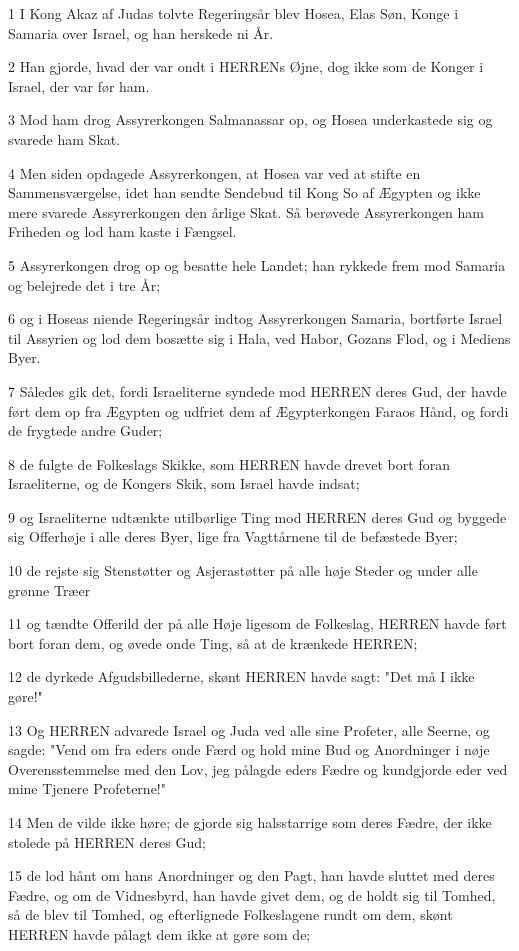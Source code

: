 \par 1 I Kong Akaz af Judas tolvte Regeringsår blev Hosea, Elas Søn, Konge i Samaria over Israel, og han herskede ni År.
\par 2 Han gjorde, hvad der var ondt i HERRENs Øjne, dog ikke som de Konger i Israel, der var før ham.
\par 3 Mod ham drog Assyrerkongen Salmanassar op, og Hosea underkastede sig og svarede ham Skat.
\par 4 Men siden opdagede Assyrerkongen, at Hosea var ved at stifte en Sammensværgelse, idet han sendte Sendebud til Kong So af Ægypten og ikke mere svarede Assyrerkongen den årlige Skat. Så berøvede Assyrerkongen ham Friheden og lod ham kaste i Fængsel.
\par 5 Assyrerkongen drog op og besatte hele Landet; han rykkede frem mod Samaria og belejrede det i tre År;
\par 6 og i Hoseas niende Regeringsår indtog Assyrerkongen Samaria, bortførte Israel til Assyrien og lod dem bosætte sig i Hala, ved Habor, Gozans Flod, og i Mediens Byer.
\par 7 Således gik det, fordi Israeliterne syndede mod HERREN deres Gud, der havde ført dem op fra Ægypten og udfriet dem af Ægypterkongen Faraos Hånd, og fordi de frygtede andre Guder;
\par 8 de fulgte de Folkeslags Skikke, som HERREN havde drevet bort foran Israeliterne, og de Kongers Skik, som Israel havde indsat;
\par 9 og Israeliterne udtænkte utilbørlige Ting mod HERREN deres Gud og byggede sig Offerhøje i alle deres Byer, lige fra Vagttårnene til de befæstede Byer;
\par 10 de rejste sig Stenstøtter og Asjerastøtter på alle høje Steder og under alle grønne Træer
\par 11 og tændte Offerild der på alle Høje ligesom de Folkeslag, HERREN havde ført bort foran dem, og øvede onde Ting, så at de krænkede HERREN;
\par 12 de dyrkede Afgudsbillederne, skønt HERREN havde sagt: "Det må I ikke gøre!"
\par 13 Og HERREN advarede Israel og Juda ved alle sine Profeter, alle Seerne, og sagde: "Vend om fra eders onde Færd og hold mine Bud og Anordninger i nøje Overensstemmelse med den Lov, jeg pålagde eders Fædre og kundgjorde eder ved mine Tjenere Profeterne!"
\par 14 Men de vilde ikke høre; de gjorde sig halsstarrige som deres Fædre, der ikke stolede på HERREN deres Gud;
\par 15 de lod hånt om hans Anordninger og den Pagt, han havde sluttet med deres Fædre, og om de Vidnesbyrd, han havde givet dem, og de holdt sig til Tomhed, så de blev til Tomhed, og efterlignede Folkeslagene rundt om dem, skønt HERREN havde pålagt dem ikke at gøre som de;
